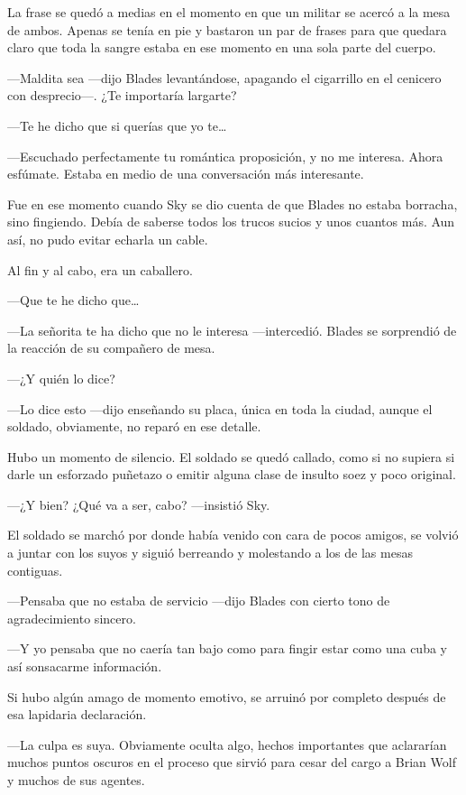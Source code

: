 La frase se quedó a medias en el momento en que un militar se acercó a la mesa de ambos. Apenas se tenía en pie y bastaron un par de frases para que quedara claro que toda la sangre estaba en ese momento en una sola parte del cuerpo.

---Maldita sea ---dijo Blades levantándose, apagando el cigarrillo en el cenicero con desprecio---. ¿Te importaría largarte?

---Te he dicho que si querías que yo te\dots{}

---Escuchado perfectamente tu romántica proposición, y no me interesa. Ahora esfúmate. Estaba en medio de una conversación más interesante.

Fue en ese momento cuando Sky se dio cuenta de que Blades no estaba borracha, sino fingiendo. Debía de saberse todos los trucos sucios y unos cuantos más. Aun así, no pudo evitar echarla un cable.

Al fin y al cabo, era un caballero.

---Que te he dicho que\dots{}

---La señorita te ha dicho que no le interesa ---intercedió. Blades se sorprendió de la reacción de su compañero de mesa.

---¿Y quién lo dice?

---Lo dice esto ---dijo enseñando su placa, única en toda la ciudad, aunque el soldado, obviamente, no reparó en ese detalle.

Hubo un momento de silencio. El soldado se quedó callado, como si no supiera si darle un esforzado puñetazo o emitir alguna clase de insulto soez y poco original.

---¿Y bien? ¿Qué va a ser, cabo? ---insistió Sky.

El soldado se marchó por donde había venido con cara de pocos amigos, se volvió a juntar con los suyos y siguió berreando y molestando a los de las mesas contiguas.

---Pensaba que no estaba de servicio ---dijo Blades con cierto tono de agradecimiento sincero.

---Y yo pensaba que no caería tan bajo como para fingir estar como una cuba y así sonsacarme información.

Si hubo algún amago de momento emotivo, se arruinó por completo después de esa lapidaria declaración.

---La culpa es suya. Obviamente oculta algo, hechos importantes que aclararían muchos puntos oscuros en el proceso que sirvió para cesar del cargo a Brian Wolf y muchos de sus agentes.

